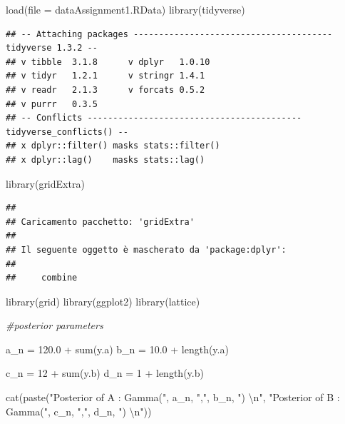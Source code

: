 \documentclass[
  11pt,
]{article}
\newenvironment{Shaded}{\begin{snugshade}}{\end{snugshade}}
\newcommand{\AttributeTok}[1]{\textcolor[rgb]{0.77,0.63,0.00}{#1}}
\newcommand{\CommentTok}[1]{\textcolor[rgb]{0.56,0.35,0.01}{\textit{#1}}}
\newcommand{\DecValTok}[1]{\textcolor[rgb]{0.00,0.00,0.81}{#1}}
\newcommand{\FloatTok}[1]{\textcolor[rgb]{0.00,0.00,0.81}{#1}}
\newcommand{\FunctionTok}[1]{\textcolor[rgb]{0.00,0.00,0.00}{#1}}
\newcommand{\NormalTok}[1]{#1}
\newcommand{\OtherTok}[1]{\textcolor[rgb]{0.56,0.35,0.01}{#1}}
\newcommand{\SpecialCharTok}[1]{\textcolor[rgb]{0.00,0.00,0.00}{#1}}
\newcommand{\StringTok}[1]{\textcolor[rgb]{0.31,0.60,0.02}{#1}}
\begin{document}
\begin{Shaded}
\begin{Highlighting}[]
\FunctionTok{load}\NormalTok{(}\AttributeTok{file =} \StringTok{\textquotesingle{}dataAssignment1.RData\textquotesingle{}}\NormalTok{)}
\FunctionTok{library}\NormalTok{(tidyverse)}
\end{Highlighting}
\end{Shaded}

\begin{verbatim}
## -- Attaching packages --------------------------------------- tidyverse 1.3.2 --
## v tibble  3.1.8      v dplyr   1.0.10
## v tidyr   1.2.1      v stringr 1.4.1 
## v readr   2.1.3      v forcats 0.5.2 
## v purrr   0.3.5      
## -- Conflicts ------------------------------------------ tidyverse_conflicts() --
## x dplyr::filter() masks stats::filter()
## x dplyr::lag()    masks stats::lag()
\end{verbatim}

\begin{Shaded}
\begin{Highlighting}[]
\FunctionTok{library}\NormalTok{(gridExtra)}
\end{Highlighting}
\end{Shaded}

\begin{verbatim}
## 
## Caricamento pacchetto: 'gridExtra'
## 
## Il seguente oggetto è mascherato da 'package:dplyr':
## 
##     combine
\end{verbatim}

\begin{Shaded}
\begin{Highlighting}[]
\FunctionTok{library}\NormalTok{(grid)}
\FunctionTok{library}\NormalTok{(ggplot2)}
\FunctionTok{library}\NormalTok{(lattice)}

\CommentTok{\#posterior parameters}

\NormalTok{a\_n }\OtherTok{=} \FloatTok{120.0} \SpecialCharTok{+} \FunctionTok{sum}\NormalTok{(y.a)}
\NormalTok{b\_n }\OtherTok{=} \FloatTok{10.0} \SpecialCharTok{+} \FunctionTok{length}\NormalTok{(y.a)}

\NormalTok{c\_n }\OtherTok{=} \DecValTok{12} \SpecialCharTok{+} \FunctionTok{sum}\NormalTok{(y.b)}
\NormalTok{d\_n }\OtherTok{=} \DecValTok{1} \SpecialCharTok{+} \FunctionTok{length}\NormalTok{(y.b)}

\FunctionTok{cat}\NormalTok{(}\FunctionTok{paste}\NormalTok{(}\StringTok{"Posterior of A : Gamma("}\NormalTok{, a\_n, }\StringTok{","}\NormalTok{, b\_n, }\StringTok{") }\SpecialCharTok{\textbackslash{}n}\StringTok{"}\NormalTok{,  }\StringTok{"Posterior of B : Gamma("}\NormalTok{, c\_n, }\StringTok{","}\NormalTok{, d\_n, }\StringTok{") }\SpecialCharTok{\textbackslash{}n}\StringTok{"}\NormalTok{))}
\end{Highlighting}
\end{Shaded}
\end{document}
